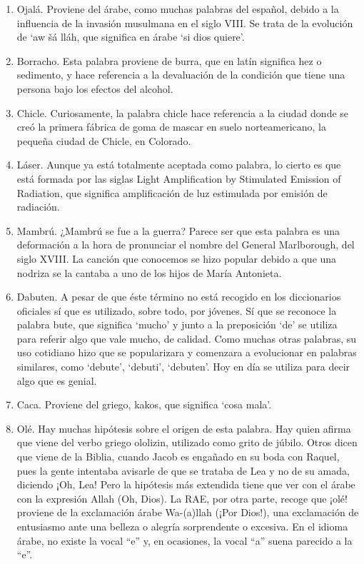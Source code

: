 \documentclass{mylib/reporte}
\begin{document}
\begin{enumerate}
	\item Ojalá. Proviene del árabe, como muchas palabras del español, debido a la influencia de la invasión musulmana en el siglo VIII. Se trata de la evolución de ‘aw šá lláh, que significa en árabe ‘si dios quiere’.
	\item Borracho. Esta palabra proviene de burra, que en latín significa hez o sedimento, y hace referencia a la devaluación de la condición que tiene una persona bajo los efectos del alcohol.
	\item Chicle. Curiosamente, la palabra chicle hace referencia a la ciudad donde se creó la primera fábrica de goma de mascar en suelo norteamericano, la pequeña ciudad de Chicle, en Colorado.
	\item Láser. Aunque ya está totalmente aceptada como palabra, lo cierto es que está formada por las siglas Light Amplification by Stimulated Emission of Radiation, que significa amplificación de luz estimulada por emisión de radiación.
	\item Mambrú. ¿Mambrú se fue a la guerra? Parece ser que esta palabra es una deformación a la hora de pronunciar el nombre del General Marlborough, del siglo XVIII. La canción que conocemos se hizo popular debido a que una nodriza se la cantaba a uno de los hijos de María Antonieta.
	\item Dabuten. A pesar de que éste término no está recogido en los diccionarios oficiales sí que es utilizado, sobre todo, por jóvenes. Sí que se reconoce la palabra bute, que significa ‘mucho’ y junto a la preposición ‘de’ se utiliza para referir algo que vale mucho, de calidad. Como muchas otras palabras, su uso cotidiano hizo que se popularizara y comenzara a evolucionar en palabras similares, como ‘debute’, ‘debuti’, ‘debuten’. Hoy en día se utiliza para decir algo que es genial.
	\item Caca. Proviene del griego, kakos, que significa ‘cosa mala’.
	\item Olé. Hay muchas hipótesis sobre el origen de esta palabra. Hay quien afirma que viene del verbo griego ololizin, utilizado como grito de júbilo. Otros dicen que viene de la Biblia, cuando Jacob es engañado en su boda con Raquel, pues la gente intentaba avisarle de que se trataba de Lea y no de su amada, diciendo ¡Oh, Lea! Pero la hipótesis más extendida tiene que ver con el árabe con la expresión Allah (Oh, Dios). La RAE, por otra parte, recoge que ¡olé! proviene de la exclamación árabe Wa-(a)llah (¡Por Dios!), una exclamación de entusiasmo ante una belleza o alegría sorprendente o excesiva. En el idioma árabe, no existe la vocal “e” y, en ocasiones, la vocal “a” suena parecido a la “e”.

\end{enumerate}
\end{document}
